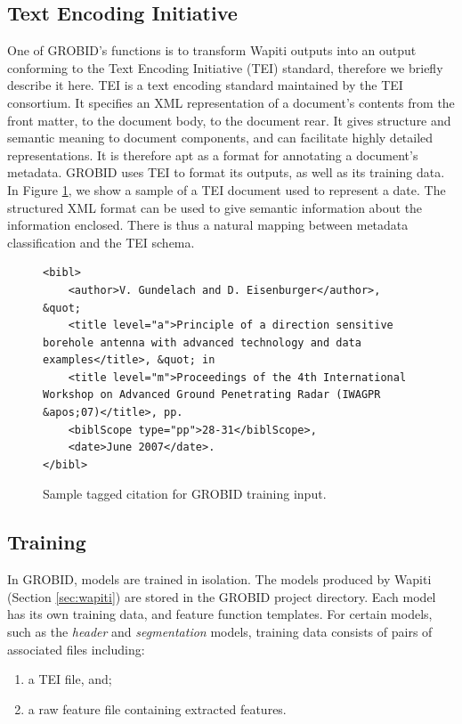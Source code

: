 \subsection{Text Encoding Initiative}
\label{subsec:tei}
One of GROBID's functions is to transform Wapiti outputs into an output conforming to the Text Encoding Initiative (TEI) standard, therefore we briefly describe it here. TEI is a text encoding standard maintained by the TEI consortium. It specifies an XML representation of a document's contents from the front matter, to the document body, to the document rear. It gives structure and semantic meaning to document components, and can facilitate highly detailed representations. It is therefore apt as a format for annotating a document's metadata. GROBID uses TEI to format its outputs, as well as its training data. In Figure \ref{fig:tei}, we show a sample of a TEI document used to represent a date. The structured XML format can be used to give semantic information about the information enclosed. There is thus a natural mapping between metadata classification and the TEI schema.

\begin{figure}
\lstset{language=XML}
\begin{lstlisting}
<bibl>
    <author>V. Gundelach and D. Eisenburger</author>, &quot; 
    <title level="a">Principle of a direction sensitive borehole antenna with advanced technology and data examples</title>, &quot; in 
    <title level="m">Proceedings of the 4th International Workshop on Advanced Ground Penetrating Radar (IWAGPR &apos;07)</title>, pp. 
    <biblScope type="pp">28-31</biblScope>, 
    <date>June 2007</date>.
</bibl>
\end{lstlisting}
\caption{Sample tagged citation for GROBID training input.}
\label{fig:tei}
\end{figure}

\subsection{Training}
\label{subsec:training}

In GROBID, models are trained in isolation. The models produced by Wapiti (Section \ref{sec:wapiti}) are stored in the GROBID project directory. Each model has its own training data, and feature function templates. For certain models, such as the \emph{header} and \emph{segmentation} models, training data consists of pairs of associated files including:

\begin{enumerate}
\item a TEI file, and;
\item a raw feature file containing extracted features.
\end{enumerate}

